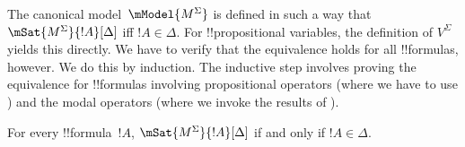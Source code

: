 \documentclass[../../../include/open-logic-section]{subfiles}
\begin{document}


The canonical model~$\mModel{M^\Sigma}$ is defined in such a way that
$\mSat{M^\Sigma}{!A}[\Delta]$ iff $!A \in \Delta$. For !!{propositional
variable}s, the definition of $V^\Sigma$ yields this directly. We have
to verify that the equivalence holds for all !!{formula}s, however. We
do this by induction. The inductive step involves proving the
equivalence for !!{formula}s involving propositional operators (where
we have to use ) and the modal
operators (where we invoke the results of ).

\begin{prop}
  For every !!{formula}~$!A$, $\mSat{M^\Sigma}{!A}[\Delta]$ if and only if
  $!A \in \Delta$.
\end{prop}
\end{document}
